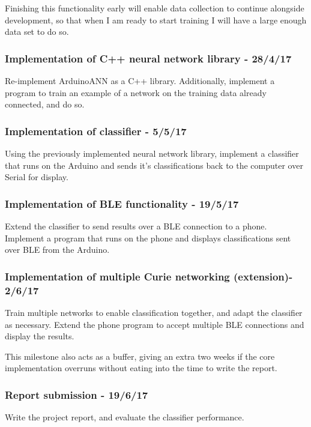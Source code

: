 \documentclass[a4paper]{article}
\begin{document}
Finishing this functionality early will enable data collection to continue alongside development, so that when I am ready to start training I will have a large enough data set to do so.

\subsubsection{Implementation of C++ neural network library - 28/4/17}

Re-implement ArduinoANN as a C++ library. Additionally, implement a program to train an example of a network on the training data already connected, and do so.

\subsubsection{Implementation of classifier - 5/5/17}

Using the previously implemented neural network library, implement a classifier that runs on the Arduino and sends it's classifications back to the computer over Serial for display.

\subsubsection{Implementation of BLE functionality - 19/5/17}

Extend the classifier to send results over a BLE connection to a phone. Implement a program that runs on the phone and displays classifications sent over BLE from the Arduino.

\subsubsection{Implementation of multiple Curie networking (extension)- 2/6/17}

Train multiple networks to enable classification together, and adapt the classifier as necessary.
Extend the phone program to accept multiple BLE connections and display the results.

This milestone also acts as a buffer, giving an extra two weeks if the core implementation overruns without eating into the time to write the report.

\subsubsection{Report submission - 19/6/17}

Write the project report, and evaluate the classifier performance. 
\end{document}
